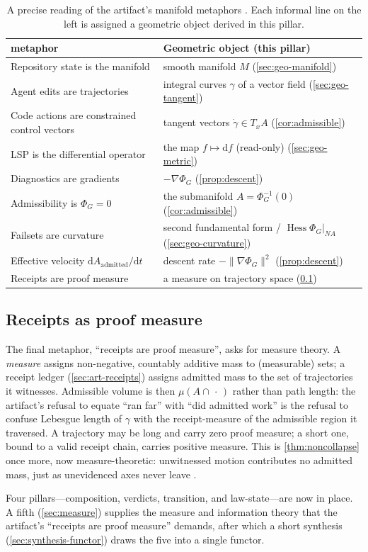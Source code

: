\begin{table}[t]
\centering
\caption[The geometry of law-state]{A precise reading of the artifact's manifold
metaphors \citep{lspmax}. Each informal line on the left is assigned a geometric
object derived in this pillar.}
\label{tab:geometry}
\small
\begin{tabularx}{\textwidth}{@{}l Y@{}}
\toprule
\textbf{ metaphor} & \textbf{Geometric object (this pillar)} \\
\midrule
Repository state is the manifold & smooth manifold $M$ (\cref{sec:geo-manifold}) \\
Agent edits are trajectories & integral curves $\gamma$ of a vector field (\cref{sec:geo-tangent}) \\
Code actions are constrained control vectors & tangent vectors $\dot\gamma\in T_xA$ (\cref{cor:admissible}) \\
LSP is the differential operator & the map $f\mapsto\mathrm df$ (read-only) (\cref{sec:geo-metric}) \\
Diagnostics are gradients & $-\nabla\Phi_G$ (\cref{prop:descent}) \\
Admissibility is $\Phi_G=0$ & the submanifold $A=\Phi_G^{-1}(0)$ (\cref{cor:admissible}) \\
Failsets are curvature & second fundamental form / $\operatorname{Hess}\Phi_G|_{NA}$ (\cref{sec:geo-curvature}) \\
Effective velocity $\mathrm dA_{\text{admitted}}/\mathrm dt$ & descent rate $-\lVert\nabla\Phi_G\rVert^2$ (\cref{prop:descent}) \\
Receipts are proof measure & a measure on trajectory space (\cref{sec:geo-measure}) \\
\bottomrule
\end{tabularx}
\end{table}

\subsection{Receipts as proof measure}
\label{sec:geo-measure}

The final metaphor, ``receipts are proof measure'', asks for measure theory. A
\emph{measure} assigns non-negative, countably additive mass to (measurable) sets;
a receipt ledger (\cref{sec:art-receipts}) assigns admitted mass to the set of
trajectories it witnesses. Admissible volume is then $\mu(A\cap\,\cdot\,)$ rather
than path length: the artifact's refusal to equate ``ran far'' with ``did
admitted work'' is the refusal to confuse Lebesgue length of $\gamma$ with the
receipt-measure of the admissible region it traversed. A trajectory may be long
and carry zero proof measure; a short one, bound to a valid receipt chain, carries
positive measure. This is \cref{thm:noncollapse} once more, now measure-theoretic:
unwitnessed motion contributes no admitted mass, just as unevidenced axes never
leave \unknownstat.

\medskip
Four pillars---composition, verdicts, transition, and law-state---are now in place.
A fifth (\cref{sec:measure}) supplies the measure and information theory that the
artifact's ``receipts are proof measure'' demands, after which a short synthesis
(\cref{sec:synthesis-functor}) draws the five into a single functor.
